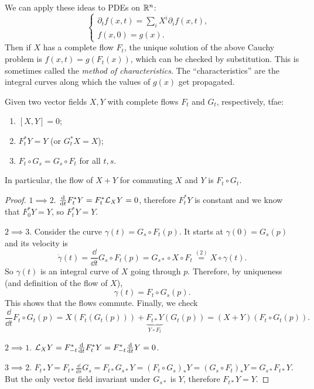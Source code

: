 \begin{rem}
    We can apply these ideas to PDEs on $\mathbb{R}^n$:
    \[\begin{cases}
        \partial_t f(x,t)=\sum _i X^i \partial_i f(x,t),&\\
        f(x,0)=g(x).&
    \end{cases}\]
    Then if $X$ has a complete flow $F_t$, the unique solution of the above Cauchy problem is $f(x,t)=g(F_t(x))$, which can be checked by substitution. This is sometimes called the \emph{method of characteristics}. The ``characteristics'' are the integral curves along which the values of $g(x)$ get propagated.
\end{rem}

\begin{prop}
    Given two vector fields $X,Y$ with complete flows $F_t$ and $G_t$, respectively, \gls{tfae}:
    \begin{enumerate}
        \item $[X,Y]=0$;
        \item $F^\ast_t Y=Y$ (or $G^\ast_t X=X$);
        \item $F_t\circ G_s=G_s\circ F_t$ for all $t,s$. 
    \end{enumerate}
    In particular, the flow of $X+Y$ for commuting $X$ and $Y$ is $F_t\circ G_t$.
\end{prop}
\begin{proof}
    $1\implies 2$. $\frac{{\mathrm{d}}}{{\mathrm{d}} t}F^\ast_t Y=F^\ast_t \mathcal{L}_X Y=0$, therefore $F^\ast_t Y$ is constant and we know that $F^\ast_0 Y=Y$, so $F^\ast_t Y=Y$.

    $2\implies 3$. Consider the curve $\gamma(t)=G_s\circ F_t(p)$. It starts at $\gamma(0)=G_s(p)$ and its velocity is
    \[\dot\gamma(t)=\frac{\dd}{\dd t} G_s\circ F_t(p)=G_{s\ast}\circ X\circ F_t\overset{(2)}{=}X\circ\gamma(t).\]
    So $\gamma(t)$ is an integral curve of $X$ going through $p$. Therefore, by uniqueness (and definition of the flow of $X$), 
    \[\gamma(t)=F_t\circ G_s(p).\]
    This shows that the flows commute. Finally, we check 
    \[\frac{\dd}{\dd t} F_t\circ G_t(p)=X(F_t(G_t(p)))+\underbrace{F_{t\ast }Y}_{Y\circ F_t}(G_t(p))=(X+Y)(F_t\circ G_t(p)).\]

    $2\implies 1$. $\mathcal{L}_X Y=F^\ast_{-t}\frac{{\mathrm{d}}}{{\mathrm{d}} t}F^\ast_t Y=F^\ast_{-t} \frac{{\mathrm{d}}}{{\mathrm{d}} t}Y=0$.

    $3\implies 2$. $F_{t\ast}Y=F_{t\ast}\frac{\dd}{\dd s}G_s=F_{t\ast} G_{s\ast} Y=(F_t\circ G_s)_\ast Y=(G_s\circ F_t)_\ast Y=G_{s\ast}F_{t\ast}Y$. But the only vector field invariant under $G_{s\ast}$ is $Y$, therefore $F_{t\ast}Y=Y$.
\end{proof}

